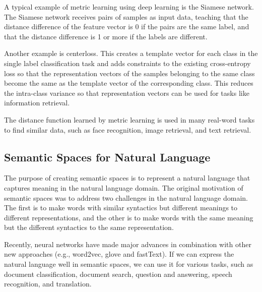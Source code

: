 A typical example of metric learning using deep learning is the Siamese network. The Siamese network receives pairs of samples as input data, teaching that the distance difference of the feature vector is 0 if the pairs are the same label, and that the distance difference is 1 or more if the labels are different.

Another example is centerloss\cite{wen2016discriminative}. This creates a template vector for each class in the single label classification task and adds constraints to the existing cross-entropy loss so that the representation vectors of the samples belonging to the same class become the same as the template vector of the corresponding class. This reduces the intra-class variance so that representation vectors can be used for tasks like information retrieval.

The distance function learned by metric learning is used in many real-word tasks to find similar data, such as face recognition, image retrieval, and text retrieval\cite{sun2014deep, huang2013learning, wan2014deep}.




\subsection{Semantic Spaces for Natural Language}

The purpose of creating semantic spaces is to represent a natural language that captures meaning in the natural language domain. The original motivation of semantic spaces was to address two challenges in the natural language domain. The first is to make words with similar syntactics but different meanings to different representations, and the other is to make words with the same meaning but the different syntactics to the same representation.

Recently, neural networks have made major advances in combination with other new approaches (e.g., word2vec\cite{mikolov2013efficient},  glove\cite{pennington2014glove} and fastText\cite{joulin2016fasttext}). If we can express the natural language well in semantic spaces, we can use it for various tasks, such as document classification, document search, question and answering, speech recognition, and translation.

